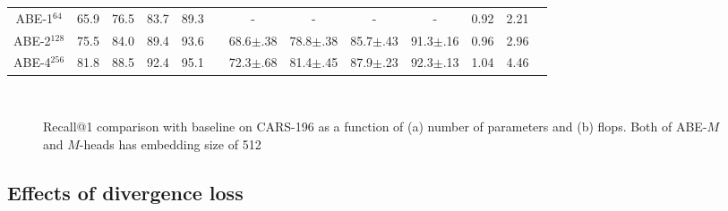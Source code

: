 \documentclass[runningheads]{llncs}
\begin{document}
\begin{table}
\begin{center}
\begin{tabular}{Sl   c c c c      c     c c c c    c c }
\hspace{-1mm}ABE-1$^{64}$ & 65.9 & 76.5 & 83.7 & 89.3 && - & - &- &- & 0.92 & 2.21\\
\hspace{-1mm}ABE-2$^{128}$ & 75.5 & 84.0 & 89.4 & 93.6 && 68.6\tiny{$\pm$.38} & 78.8\tiny{$\pm$.38} &85.7\tiny{$\pm$.43} &91.3\tiny{$\pm$.16} & 0.96 & 2.96\\
\hspace{-1mm}ABE-4$^{256}$ & 81.8 & 88.5 & 92.4 & 95.1 && 72.3\tiny{$\pm$.68} & 81.4\tiny{$\pm$.45} &87.9\tiny{$\pm$.23} &92.3\tiny{$\pm$.13} & 1.04 & 4.46\\
\hline
\end{tabular}
\end{center}
\end{table}
\label{table:baseline}
\vspace{-6mm}
\setlength{\tabcolsep}{1.4pt}


\begin{figure}[t]
\begin{center}
    \mbox{
\hspace{5mm}
    }
\end{center}
\vspace{-8mm}
\caption{Recall@1 comparison with baseline on CARS-196 as a function of (a) number of parameters and (b) flops. Both of ABE-$M$ and $M$-heads has embedding size of 512}
\label{fig:r_vs_x}
\vspace{-3mm}
\end{figure}



\vspace{-3mm}
\subsection{Effects of divergence loss}\label{sec:effectsofdivloss}
\vspace{-1mm}
\end{document}
